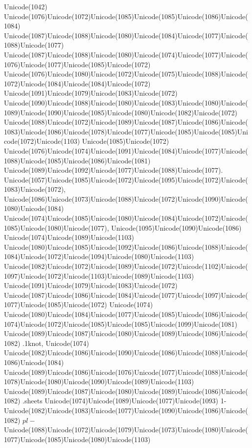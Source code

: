 \documentclass[a4paper,11pt]{report}
\begin{document}
{{\begin{Verbatim}[commandchars=!@|,fontsize=\small,frame=single,label=Пример]
\end{Verbatim}
 Unicode(1042)
Unicode(1076)Unicode(1072)Unicode(1085)Unicode(1085)Unicode(1086)Unicode(1084)
Unicode(1087)Unicode(1088)Unicode(1080)Unicode(1084)Unicode(1077)Unicode(1088)Unicode(1077)
Unicode(1087)Unicode(1088)Unicode(1080)Unicode(1074)Unicode(1077)Unicode(1076)Unicode(1077)Unicode(1085)Unicode(1072)
Unicode(1076)Unicode(1080)Unicode(1072)Unicode(1075)Unicode(1088)Unicode(1072)Unicode(1084)Unicode(1084)Unicode(1072)
Unicode(1091)Unicode(1079)Unicode(1083)Unicode(1072)
Unicode(1090)Unicode(1088)Unicode(1080)Unicode(1083)Unicode(1080)Unicode(1089)Unicode(1090)Unicode(1085)Unicode(1080)Unicode(1082)Unicode(1072)
Unicode(1088)Unicode(1072)Unicode(1089)Unicode(1087)Unicode(1086)Unicode(1083)Unicode(1086)Unicode(1078)Unicode(1077)Unicode(1085)Unicode(1085)Unicode(1072)Unicode(1103)
Unicode(1085)Unicode(1072)
Unicode(1076)Unicode(1074)Unicode(1091)Unicode(1084)Unicode(1077)Unicode(1088)Unicode(1085)Unicode(1086)Unicode(1081)
Unicode(1089)Unicode(1092)Unicode(1077)Unicode(1088)Unicode(1077).
Unicode(1057)Unicode(1085)Unicode(1072)Unicode(1095)Unicode(1072)Unicode(1083)Unicode(1072),
Unicode(1086)Unicode(1073)Unicode(1088)Unicode(1072)Unicode(1090)Unicode(1080)Unicode(1084)
Unicode(1074)Unicode(1085)Unicode(1080)Unicode(1084)Unicode(1072)Unicode(1085)Unicode(1080)Unicode(1077),
Unicode(1095)Unicode(1090)Unicode(1086)
Unicode(1074)Unicode(1089)Unicode(1103)
Unicode(1080)Unicode(1085)Unicode(1092)Unicode(1086)Unicode(1088)Unicode(1084)Unicode(1072)Unicode(1094)Unicode(1080)Unicode(1103)
Unicode(1082)Unicode(1072)Unicode(1089)Unicode(1072)Unicode(1102)Unicode(1097)Unicode(1072)Unicode(1103)Unicode(1089)Unicode(1103)
Unicode(1091)Unicode(1079)Unicode(1083)Unicode(1072)
Unicode(1087)Unicode(1086)Unicode(1084)Unicode(1077)Unicode(1097)Unicode(1077)Unicode(1085)Unicode(1072)
Unicode(1074)
Unicode(1080)Unicode(1084)Unicode(1077)Unicode(1085)Unicode(1086)Unicode(1074)Unicode(1072)Unicode(1085)Unicode(1085)Unicode(1099)Unicode(1081)
Unicode(1089)Unicode(1087)Unicode(1080)Unicode(1089)Unicode(1086)Unicode(1082)
.1knot, Unicode(1074)
Unicode(1082)Unicode(1086)Unicode(1090)Unicode(1086)Unicode(1088)Unicode(1086)Unicode(1084)
Unicode(1089)Unicode(1086)Unicode(1076)Unicode(1077)Unicode(1088)Unicode(1078)Unicode(1080)Unicode(1090)Unicode(1089)Unicode(1103)
Unicode(1089)Unicode(1087)Unicode(1080)Unicode(1089)Unicode(1086)Unicode(1082)
.sheets Unicode(1074)Unicode(1089)Unicode(1077)Unicode(1093)
1-Unicode(1082)Unicode(1083)Unicode(1077)Unicode(1090)Unicode(1086)Unicode(1082) $pl-$Unicode(1088)Unicode(1072)Unicode(1079)Unicode(1073)Unicode(1080)Unicode(1077)Unicode(1085)Unicode(1080)Unicode(1103)
}}
\end{document}
